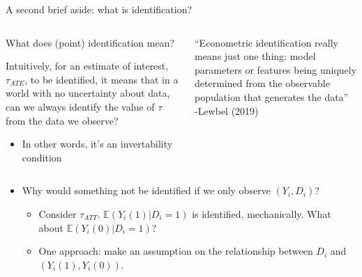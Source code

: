 \documentclass[notes,11pt, aspectratio=169]{beamer}
\newenvironment{wideitemize}{\itemize\addtolength{\itemsep}{10pt}}{\enditemize}
\begin{document}
\begin{frame}{A second brief aside: what is identification?}
\begin{columns}[T] %
\begin{column}{.6\textwidth}
  \begin{wideitemize}
  \item What does (point) identification mean?
    \pause
  \item Intuitively, for an estimate of interest,
    $\tau_{ATE}$, to be identified, it means that in a world
    with no uncertainty about data, can we always identify the value
    of $\tau$ from the data we observe?
    \begin{itemize}
    \item In other words, it's an invertability condition
    \end{itemize}
  \end{wideitemize}
\end{column}%
\hfill%
\begin{column}{.38\textwidth}
  \vspace{20pt}
``Econometric identification really means
just one thing: model parameters or
features being uniquely determined from
the observable population that generates
the data''\\
\hfill -Lewbel (2019)
\end{column}%
\end{columns}

\pause
\vspace{5pt}
\begin{itemize}
  \item Why would something not be identified if we only observe $(Y_{i}, D_{i})$?
    \begin{itemize}
    \item Consider $\tau_{ATT}$. $\mathbb{E}(Y_{i}(1)| D_{i}= 1)$ is
      identified, mechanically. What about $\mathbb{E}(Y_{i}(0) | D_{i} = 1)$?
    \item One approach: make an assumption on the relationship between $D_{i}$ and
      $(Y_{i}(1), Y_{i}(0))$.
    \end{itemize}
\end{itemize}
\end{frame}
\end{document}
